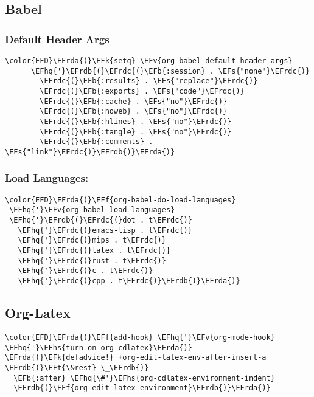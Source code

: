 \documentclass{article}
\newcommand{\EFs}[1]{\textcolor{EFs}{#1}} %
\newcommand{\EFk}[1]{\textcolor{EFk}{#1}} %
\newcommand{\EFb}[1]{\textcolor{EFb}{#1}} %
\newcommand{\EFf}[1]{\textcolor{EFf}{#1}} %
\newcommand{\EFv}[1]{\textcolor{EFv}{#1}} %
\newcommand{\EFt}[1]{\textcolor{EFt}{#1}} %
\newcommand{\EFhq}[1]{#1} %
\newcommand{\EFhs}[1]{\textcolor{EFhs}{#1}} %
\newcommand{\EFrda}[1]{\textcolor{EFrda}{#1}} %
\newcommand{\EFrdb}[1]{\textcolor{EFrdb}{#1}} %
\newcommand{\EFrdc}[1]{\textcolor{EFrdc}{#1}} %
\begin{document}
\subsection{Babel}
\label{sec:org2c37fac}
\subsubsection{Default Header Args}
\label{sec:org8928975}
\begin{Code}
\begin{Verbatim}
\color{EFD}\EFrda{(}\EFk{setq} \EFv{org-babel-default-header-args}
      \EFhq{'}\EFrdb{(}\EFrdc{(}\EFb{:session} . \EFs{"none"}\EFrdc{)}
        \EFrdc{(}\EFb{:results} . \EFs{"replace"}\EFrdc{)}
        \EFrdc{(}\EFb{:exports} . \EFs{"code"}\EFrdc{)}
        \EFrdc{(}\EFb{:cache} . \EFs{"no"}\EFrdc{)}
        \EFrdc{(}\EFb{:noweb} . \EFs{"no"}\EFrdc{)}
        \EFrdc{(}\EFb{:hlines} . \EFs{"no"}\EFrdc{)}
        \EFrdc{(}\EFb{:tangle} . \EFs{"no"}\EFrdc{)}
        \EFrdc{(}\EFb{:comments} . \EFs{"link"}\EFrdc{)}\EFrdb{)}\EFrda{)}

\end{Verbatim}
\end{Code}

\subsubsection{Load Languages:}
\label{sec:orga3f834b}
\begin{Code}
\begin{Verbatim}
\color{EFD}\EFrda{(}\EFf{org-babel-do-load-languages}
 \EFhq{'}\EFv{org-babel-load-languages}
 \EFhq{'}\EFrdb{(}\EFrdc{(}dot . t\EFrdc{)}
   \EFhq{'}\EFrdc{(}emacs-lisp . t\EFrdc{)}
   \EFhq{'}\EFrdc{(}mips . t\EFrdc{)}
   \EFhq{'}\EFrdc{(}latex . t\EFrdc{)}
   \EFhq{'}\EFrdc{(}rust . t\EFrdc{)}
   \EFhq{'}\EFrdc{(}c . t\EFrdc{)}
   \EFhq{'}\EFrdc{(}cpp . t\EFrdc{)}\EFrdb{)}\EFrda{)}
\end{Verbatim}
\end{Code}

\subsection{Org-Latex}
\label{sec:org5037bb9}
\begin{Code}
\begin{Verbatim}
\color{EFD}\EFrda{(}\EFf{add-hook} \EFhq{'}\EFv{org-mode-hook} \EFhq{'}\EFhs{turn-on-org-cdlatex}\EFrda{)}
\EFrda{(}\EFk{defadvice!} +org-edit-latex-env-after-insert-a \EFrdb{(}\EFt{\&rest} \_\EFrdb{)}
  \EFb{:after} \EFhq{\#'}\EFhs{org-cdlatex-environment-indent}
  \EFrdb{(}\EFf{org-edit-latex-environment}\EFrdb{)}\EFrda{)}
\end{Verbatim}
\end{Code}
\end{document}
